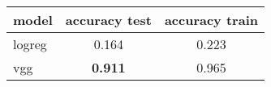 \begin{tabular}{|l | c | c|}
  \hline
  model & accuracy test & accuracy train\\
  \hline
  logreg & 0.164 & 0.223 \\
  \hline
  vgg & \textbf{0.911} & 0.965 \\
  \hline
\end{tabular}